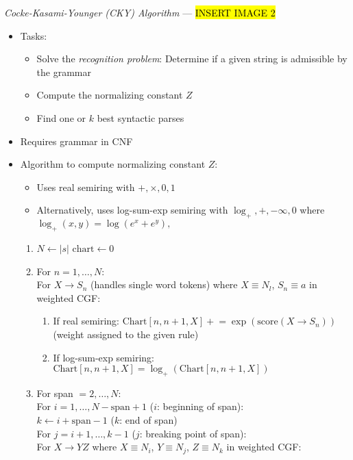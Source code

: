 \emph{Cocke-Kasami-Younger (CKY) Algorithm} ---
\hl{INSERT IMAGE 2}
\begin{itemize}
    \item Tasks:
    \begin{itemize}
        \item Solve the \emph{recognition problem}: Determine if a given string is admissible by the grammar
        \item Compute the normalizing constant $Z$
        \item Find one or $k$ best syntactic parses
    \end{itemize}
    \item Requires grammar in CNF
    \item Algorithm to compute normalizing constant $Z$:
    \begin{itemize}
        \item Uses real semiring with $+, \times,0,1$
        \item Alternatively, uses log-sum-exp semiring with $\log_+, +, -\infty, 0$ where 
        $
        \log_+(x, y) = \log(e^x + e^y),
        $
    \end{itemize}
    \begin{enumerate}
        \item $N \gets |s|$
        $\textrm{chart} \gets 0$
        \item For $n = 1, \dots, N$:\\
        For $X \to S_n$ (handles single word tokens) where $X \equiv N_l$, $S_n \equiv a$ in weighted CGF:
        \begin{enumerate}
            \item If real semiring: $
            \textrm{Chart}[n, n+1, X] \mathrel{+}= \exp(\textrm{score}(X \to S_n))
            $ (weight assigned to the given rule)
            \item If log-sum-exp semiring: $
            \textrm{Chart}[n, n+1, X] = \log_+( \textrm{Chart}[n, n+1, X])
            $
        \end{enumerate}
        \item For span $= 2, \dots, N$:\\
        For $i = 1, \dots, N-\textrm{span}+1$ ($i$: beginning of span):\\
        $k \gets i + \textrm{span} - 1$ ($k$: end of span)\\
        For $j = i+1, \dots, k-1$ ($j$: breaking point of span):\\
        For $X \to Y Z$ where $X \equiv N_i$, $Y \equiv N_j$, $Z \equiv N_k$ in weighted CGF:

\end{enumerate}
\end{itemize}
